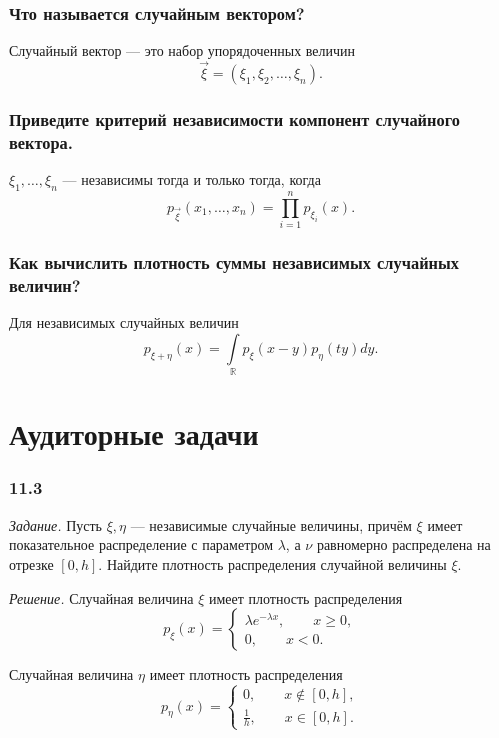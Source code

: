 \subsubsection*{Что называется случайным вектором?}

Случайный вектор --- это набор упорядоченных величин
$$ \vec{ \xi } =
\left( \xi_1, \xi_2, \dotsc, \xi_n \right).$$

\subsubsection*{Приведите критерий независимости компонент случайного вектора.}

$ \xi_1, \dotsc, \xi_n$ --- независимы тогда и только тогда, когда
$$p_{ \vec{ \xi }} \left( x_1, \dotsc, x_n \right) =
\prod \limits_{i=1}^n p_{ \xi_i} \left( x \right).$$

\subsubsection*{Как вычислить плотность суммы независимых случайных величин?}

Для независимых случайных величин
$$p_{ \xi + \eta } \left( x \right) =
\int \limits_{ \mathbb{R}} p_{ \xi } \left( x-y \right) p_{ \eta } \left(t y \right) dy.$$

\section*{Аудиторные задачи}

\subsubsection*{11.3}

\textit{Задание.} Пусть $ \xi, \eta $ --- независимые случайные величины, причём $ \xi $ имеет показательное распределение с параметром $ \lambda $, а $ \nu $ равномерно распределена на отрезке $ \left[ 0, h \right] $.
Найдите плотность распределения случайной величины $ \xi $. 

\textit{Решение.} Случайная величина $ \xi $ имеет плотность распределения
$$p_{ \xi } \left( x \right) =
\begin{cases}
\lambda e^{- \lambda x}, \qquad x \geq 0, \\
0, \qquad x < 0.
\end{cases}$$

Случайная величина $ \eta $ имеет плотность распределения
$$p_{ \eta } \left( x \right) =
\begin{cases}
0, \qquad x \notin \left[ 0, h \right], \\
\frac{1}{h}, \qquad x \in \left[ 0, h \right].
\end{cases}$$

